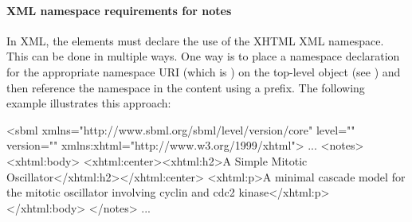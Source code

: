 


\paragraph{XML namespace requirements for notes}

In XML, the  elements must declare the use of
the XHTML XML namespace.  This can be done in multiple ways.  One
way is to place a namespace declaration for the appropriate
namespace URI (which is ) on the
top-level \SBML object (see ) and then
reference the namespace in the  content using a
prefix.  The following example illustrates this approach:


\begin{example}
<sbml xmlns="http://www.sbml.org/sbml/level\sbmllevel/version\sbmlversionnum/core" level="\sbmllevel" version="\sbmlversionnum"
      xmlns:xhtml="http://www.w3.org/1999/xhtml">
  ...
  <notes>
    <xhtml:body>
      <xhtml:center><xhtml:h2>A Simple Mitotic Oscillator</xhtml:h2></xhtml:center>
      <xhtml:p>A minimal cascade model for the mitotic oscillator
      involving cyclin and cdc2 kinase</xhtml:p>
    </xhtml:body>
  </notes>
  ...
\end{example}

